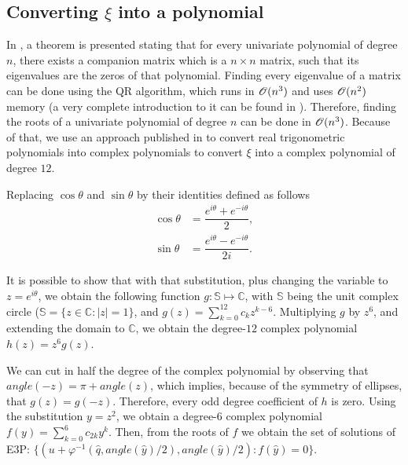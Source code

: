 \subsection{Converting $\xi$ into a polynomial}

In \cite[p.~195]{horn}, a theorem is presented stating that for every univariate polynomial of degree $n$, there exists a companion matrix which is a $n\times n$ matrix, such that its eigenvalues are the zeros of that polynomial. Finding every eigenvalue of a matrix can be done using the QR algorithm, which runs in $\mathscr{O}(n^3)$ and uses $\mathscr{O}(n^2)$ memory (a very complete introduction to it can be found in \cite{watkins:2008}). Therefore, finding the roots of a univariate polynomial of degree $n$ can be done in $\mathscr{O}(n^3)$. Because of that, we use an approach published in  \cite{boyd:2006} to convert real trigonometric polynomials into complex polynomials to convert $\xi$ into a complex polynomial of degree $12$.

Replacing $\cos{\theta}$ and $\sin{\theta}$ by their identities defined as follows
\begin{align}\label{eq:complex_trig_cos}
\cos{\theta} &= \dfrac{e^{i\theta} + e^{-i\theta}}{2},\\
\label{eq:complex_trig_sin}
\sin{\theta} &= \dfrac{e^{i\theta} - e^{-i\theta}}{2i}.
\end{align}

It is possible to show that with that substitution, plus changing the variable to $z=e^{i\theta}$, we obtain the following function $g : \mathbb{S} \mapsto \mathbb{C}$, with $\mathbb{S}$ being the unit complex circle ($\mathbb{S} = \{z \in \mathbb{C} : |z|=1\}$, and $g(z) = \sum_{k=0}^{12} c_k z^{k-6}$. Multiplying $g$ by $z^6$, and extending the domain to $\mathbb{C}$, we obtain the degree-$12$ complex polynomial $h(z) = z^6g(z)$.

We can cut in half the degree of the complex polynomial by observing that $angle(-z) = \pi + angle(z)$, which implies, because of the symmetry of ellipses, that $g(z) = g(-z)$. Therefore, every odd degree coefficient of $h$ is zero. Using the substitution $y = z^2$, we obtain a degree-$6$ complex polynomial $f(y) = \sum_{k=0}^{6} c_{2k} y^{k}$. Then, from the roots of $f$ we obtain the set of solutions of E3P:
$\{(u + \varphi^{-1}(\hat{q}, angle(\hat{y})/2), angle(\hat{y})/2) \colon f(\hat{y})=0\}$.